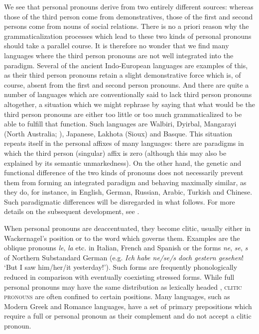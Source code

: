 \label{page43}We see that personal pronouns derive from two entirely different sources: whereas those of the third person come from demonstratives, those of the first and second persons come from nouns of social relations. There is no a priori reason why the grammaticalization processes which lead to these two kinds of personal pronouns should take a parallel course. It is therefore no wonder that we find many languages where the third person pronouns are not well integrated into the paradigm. Several of the ancient Indo-European languages are examples of this, as their third person pronouns retain a slight demonstrative force which is, of course, absent from the first and second person pronouns. And there are quite a number of languages which are conventionally said to lack third person pronouns altogether, a situation which we might rephrase by saying that what would be the third person pronouns are either too little or too much grammaticalized to be able to fulfill that function. Such languages are Walbiri, Dyirbal, Mangarayi (North Australia; \citealt[99]{Merlan1982}), Japanese, Lakhota (Sioux) and Basque. This situation repeats itself in the personal affixes of many languages: there are paradigms in which the third person (singular) affix is zero (although this may also be explained by its semantic unmarkedness). On the other hand, the genetic and functional difference of the two kinds of pronouns does not necessarily prevent them from forming an integrated paradigm and behaving maximally similar, as they do, for instance, in English, German, Russian, Arabic, Turkish and Chinese. Such paradigmatic differences will be disregarded in what follows. For more details on the subsequent development, see \citet[§§6.2 and 7.1]{Lehmann1982b}.

When personal pronouns are deaccentuated, they become clitic, usually either in Wackernagel's position or to the word which governs them. Examples are the oblique pronouns \textit{le}, \textit{la} etc. in Italian, French and Spanish or the forms \textit{ne}, \textit{se}, \textit{s} of Northern Substandard %
German (e.g. \textit{Ich habe ne/se/s doch gestern gesehen}! ‘But I saw him/her/it yesterday!’). Such forms are frequently phonologically reduced in comparison with eventually coexisting stressed forms.\label{page44b} While full personal pronouns may have the same distribution as lexically headed \nps, \textsc{clitic pronouns} are often confined to certain positions. Many languages, such as Modern Greek and Romance languages, have a set of primary prepositions which require a full \np or personal pronoun as their complement and do not accept a clitic pronoun.

